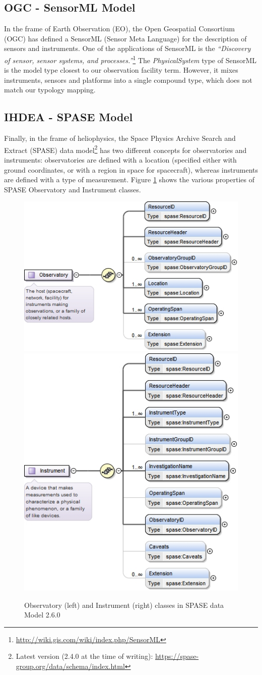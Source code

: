 \documentclass[11pt,a4paper]{ivoa}
\begin{document}
\subsection{OGC - SensorML Model}
In the frame of Earth Observation (EO), the Open Geospatial Consortium
(OGC) has defined a SensorML (Sensor Meta Language) \citep{ogc-sensorml}
for the description of sensors and instruments. One of the applications of
SensorML is the \emph{``Discovery of sensor, sensor systems, and
processes.''}\footnote{\url{http://wiki.gis.com/wiki/index.php/SensorML}}
The \emph{PhysicalSystem} type of SensorML is the model type closest to
our observation facility term.  However, it mixes instruments, sensors
and platforms into a single compound type, which does not match our
typology mapping.

\subsection{IHDEA - SPASE Model}
\label{appendx:models:spase}
Finally, in the frame of heliophysics, the Space Physics Archive Search
and Extract (SPASE) data model\footnote{Latest version (2.4.0 at the
time of writing): \url{https://spase-group.org/data/schema/index.html}}
\citep{Roberts:2018bi,spase-model} has two different
concepts for observatories and instruments: observatories are defined
with a location (specified either with ground coordinates, or with a
region in space for spacecraft), whereas instruments are defined with
a type of measurement. Figure \ref{fig:spase-observatory} shows the
various properties of SPASE Observatory and Instrument classes.

\begin{figure}
{\centering\includegraphics[align=c,width=0.49\linewidth]{spase-2_6_0_xsd_Complex_Type_spase_Observatory.jpg}
\includegraphics[align=c,width=0.49\linewidth]{spase-2_6_0_xsd_Complex_Type_spase_Instrument.jpg}}
\caption{Observatory (left) and Instrument (right) classes in SPASE data Model 2.6.0}\label{fig:spase-observatory}
\end{figure}
\end{document}

